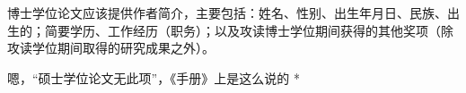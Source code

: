 \biography
博士学位论文应该提供作者简介，主要包括：姓名、性别、出生年月日、民族、出生的；简要学历、工作经历（职务）；以及攻读博士学位期间获得的其他奖项（除攻读学位期间取得的研究成果之外）。

\par * 嗯，“硕士学位论文无此项”，《手册》上是这么说的 * \par
